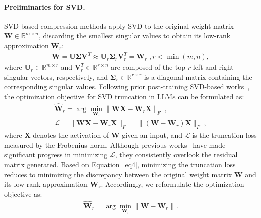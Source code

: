\paragraph{Preliminaries for SVD.} SVD-based compression methods apply SVD to the original weight matrix $\boldsymbol{W}\in\mathbb{R}^{m\times n}$, discarding the smallest singular values to obtain its low-rank approximation $\boldsymbol{W}_r$:
\begin{align}
   \boldsymbol{W} = \boldsymbol{U}\boldsymbol{\Sigma} \boldsymbol{V}^T \approx \boldsymbol{U}_r\boldsymbol{\Sigma}_r\boldsymbol{V}_r^T = \boldsymbol{W}_r\;,r < \min(m,n),
\end{align}
where $\boldsymbol{U}_r\in\mathbb{R}^{m\times r}$ and $\boldsymbol{V}_r^T\in\mathbb{R}^{r\times n}$ are composed of the top-$r$ left and right singular vectors, respectively, and $\boldsymbol{\Sigma}_r\in\mathbb{R}^{r\times r}$ is a diagonal matrix containing the corresponding singular values. 
Following prior post-training SVD-based works~\cite{yuan2023asvd,wang2024svd}, the optimization objective for SVD truncation in LLMs can be formulated as:
\begin{gather}
   \hat{\boldsymbol{W}}_r = \arg\min_{\boldsymbol{W}_r}\big\|\boldsymbol{WX}-\boldsymbol{W}_r \boldsymbol{X}\big\|_F \;, \\
   \mathcal{L} = \big\|\boldsymbol{WX}-\boldsymbol{W}_r \boldsymbol{X}\big\|_F = \big\|(\boldsymbol{W}-\boldsymbol{W}_r)\boldsymbol{X}\big\|_F \;, \label{eq4}
\end{gather}
where $\boldsymbol{X}$ denotes the activation of $\boldsymbol{W}$ given an input, and $\mathcal{L}$ is the truncation loss measured by the Frobenius norm. 
Although previous works~\cite{hsulanguage,yuan2023asvd,wang2024svd} have made significant progress in minimizing $\mathcal{L}$, they consistently overlook the residual matrix generated. Based on Equation~\ref{eq4}, minimizing the truncation loss reduces to minimizing the discrepancy between the original weight matrix $\boldsymbol{W}$ and its low-rank approximation $\boldsymbol{W}_r$. Accordingly, we reformulate the optimization objective as:
\begin{align}
      \hat{\boldsymbol{W}}_r = \arg\min_{\boldsymbol{W}_r}\big\|\boldsymbol{W}-\boldsymbol{W}_r\big\|.
\end{align}

